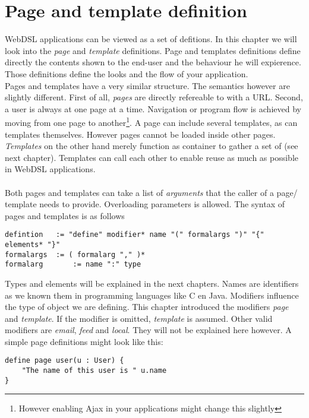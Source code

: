 \chapter{Page and template definition}
WebDSL applications can be viewed as a set of defitions. In this chapter we will look into the \emph{page} and \emph{template} definitions. Page and templates definitions define directly the contents shown to the end-user and the behaviour he will expierence. Those definitions define the looks and the flow of your application. 
\\
Pages and templates have a very similar structure. The semantics however are slightly different. First of all, \emph{pages} are directly refereable to with a URL. Second, a user is always at one page at a time. Navigation or program flow is achieved by moving from one page to another\footnote{However enabling Ajax in your applications might change this slightly}. A page can include several templates, as can templates themselves. However pages cannot be loaded inside other pages. 
\\
\emph{Templates} on the other hand merely function as container to gather a set of  (see next chapter). Templates can call each other to enable reuse as much as possible in WebDSL applications. 
\\
\\
Both pages and templates can take a list of \emph{arguments} that the caller of a page/ template needs to provide. Overloading parameters is allowed. The syntax of pages and templates is as follows
\begin{lstlisting}
defintion 	:= "define" modifier* name "(" formalargs ")" "{" elements* "}"
formalargs 	:= ( formalarg "," )*
formalarg		:= name ":" type
\end{lstlisting}
Types and elements will be explained in the next chapters. Names are identifiers as we known them in programming languages like C en Java. Modifiers influence the type of object we are defining. This chapter introduced the modifiers \emph{page} and \emph{template}. If the modifier is omitted, \emph{template} is assumed. Other valid modifiers are \emph{email}, \emph{feed} and \emph{local}. They will not be explained here however. A simple page definitions might look like this:
\begin{lstlisting}
define page user(u : User) {
	"The name of this user is " u.name
}
\end{lstlisting}

